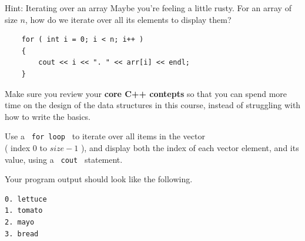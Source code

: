\documentclass[a4paper,12pt]{book}
\begin{document}
                    \begin{hint}{ Hint: Iterating over an array }
                       Maybe you're feeling a little rusty. For an array of size $ n $,
                       how do we iterate over all its elements to display them?

\begin{verbatim}
    for ( int i = 0; i < n; i++ )
    {
        cout << i << ". " << arr[i] << endl;
    }
\end{verbatim}

                        Make sure you review your \textbf{ core C++ contepts }
                        so that you can spend more time on the design of the
                        data structures in this course, instead of struggling
                        with how to write the basics.
                    \end{hint}

                    Use a \texttt{ for loop } to iterate over all items
                    in the vector \\ ( index $ 0 $ to $ size - 1 $ ), and display
                    both the index of each vector element, and its value,
                    using a \texttt{ cout } statement.

                    Your program output should look like the following.
\begin{lstlisting}[style=output]
0. lettuce
1. tomato
2. mayo
3. bread
\end{lstlisting}
\end{document}
